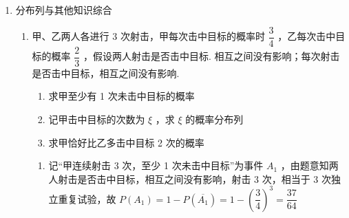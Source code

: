 \begin{enumerate}
\begin{enumerate}
\begin{jieda}
            所以 $P\left( {X = 1}\right)  = \dfrac{1 + {0.34}}{2} = {0.67}$ .
        \end{jieda}
        
        \item 已知随机变量 $X$ 服从两点分布,且 $P\left( {X = 0}\right)  = 2{a}^{2},P\left( {X = 1}\right) = a$ ,那么 $a = $.
        \begin{jieda}
            由题意可知 $P\left( {X = 0}\right)  + P\left( {X = 1}\right)  = a + 2{a}^{2} = 1 \Longrightarrow  a = \dfrac{1}{2}$ 或 $a =  - 1$ ,
            
            由于 $a > 0$ ，所以 $a = \dfrac{1}{2}$
        \end{jieda}
        
        \item 已知随机变量 $X$ 服从两点分布,且 $P\left( {X = 1}\right)  = \dfrac{3}{2}P\left( {X = 0}\right)$ , 则 $P\left( {X = 1}\right)  = $ .
        \begin{jieda}
            由随机变量 $X$ 服从两点分布,得 $P\left( {X = 1}\right)  + P\left( {X = 0}\right)  = 1$，又因为 $P\left( {X = 1}\right)  = \dfrac{3}{2}P\left( {X = 0}\right)$，所以 $P\left( {X = 1}\right)  = \dfrac{3}{5}$
        \end{jieda}
    \end{enumerate}

    \item 分布列与其他知识综合
    \begin{enumerate}
        \item 甲、乙两人各进行 3 次射击，甲每次击中目标的概率时 $\dfrac{3}{4}$ ，乙每次击中目标的概率 $\dfrac{2}{3}$ ，假设两人射击是否击中目标. 相互之间没有影响；每次射击是否击中目标，相互之间没有影响.
        \begin{enumerate}
            \item 求甲至少有 1 次未击中目标的概率
            \item 记甲击中目标的次数为 $\xi$ ，求 $\xi$ 的概率分布列
            \item 求甲恰好比乙多击中目标 2 次的概率
        \end{enumerate}
        \begin{jieda}
            \begin{enumerate}
                \item 记“甲连续射击 3 次，至少 1 次未击中目标”为事件 ${A}_{1}$ ，由题意知两人射击是否击中目标，相互之间没有影响，射击 3 次，相当于 3 次独立重复试验，故 $P\left( {A}_{1}\right)  = 1 - P\left( \overline{{A}_{1}}\right)  = 1 - {\left( \dfrac{3}{4}\right) }^{3} = \dfrac{37}{64}$
                

\end{enumerate}
\end{jieda}
\end{enumerate}
\end{enumerate}

